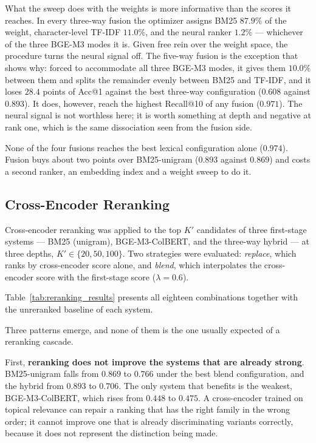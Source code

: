 \documentclass[preprint,review,12pt]{elsarticle}
\begin{document}
What the sweep does with the weights is more informative than the scores it reaches. In every three-way fusion the optimizer assigns BM25 $87.9\%$ of the weight, character-level TF-IDF $11.0\%$, and the neural ranker $1.2\%$ --- whichever of the three BGE-M3 modes it is. Given free rein over the weight space, the procedure turns the neural signal off. The five-way fusion is the exception that shows why: forced to accommodate all three BGE-M3 modes, it gives them $10.0\%$ between them and splits the remainder evenly between BM25 and TF-IDF, and it loses $28.4$ points of Acc@1 against the best three-way configuration ($0.608$ against $0.893$). It does, however, reach the highest Recall@10 of any fusion ($0.971$). The neural signal is not worthless here; it is worth something at depth and negative at rank one, which is the same dissociation seen from the fusion side.

None of the four fusions reaches the best lexical configuration alone ($0.974$). Fusion buys about two points over BM25-unigram ($0.893$ against $0.869$) and costs a second ranker, an embedding index and a weight sweep to do it.

\subsection{Cross-Encoder Reranking}
\label{subsec:reranking}

Cross-encoder reranking was applied to the top $K'$ candidates of three first-stage systems --- BM25 (unigram), BGE-M3-ColBERT, and the three-way hybrid --- at three depths, $K' \in \{20, 50, 100\}$. Two strategies were evaluated: \textit{replace}, which ranks by cross-encoder score alone, and \textit{blend}, which interpolates the cross-encoder score with the first-stage score ($\lambda = 0.6$).

Table~\ref{tab:reranking_results} presents all eighteen combinations together with the unreranked baseline of each system.


Three patterns emerge, and none of them is the one usually expected of a reranking cascade.

First, \textbf{reranking does not improve the systems that are already strong}. BM25-unigram falls from $0.869$ to $0.766$ under the best blend configuration, and the hybrid from $0.893$ to $0.706$. The only system that benefits is the weakest, BGE-M3-ColBERT, which rises from $0.448$ to $0.475$. A cross-encoder trained on topical relevance can repair a ranking that has the right family in the wrong order; it cannot improve one that is already discriminating variants correctly, because it does not represent the distinction being made.
\end{document}
